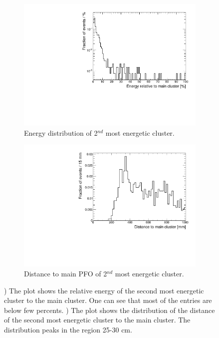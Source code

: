 \begin{figure}[htbp!]
  \centering
  \begin{subfigure}[t]{0.49\textwidth}
    \centering
    \includegraphics[width=1\linewidth]{../Thesis_Plots/ILD/AdditionalPlots/Plots/Energy2ndCluster_100ns_50GeV}
    \caption{Energy distribution of 2$^{nd}$ most energetic cluster.} \label{fig:Energy2ndCluster}
  \end{subfigure}
  \hfill
  \begin{subfigure}[t]{0.49\textwidth}
    \centering
    \includegraphics[width=1\linewidth]{../Thesis_Plots/ILD/AdditionalPlots/Plots/Distance2ndCluster_100ns_50GeV}
    \caption{Distance to main PFO of 2$^{nd}$ most energetic cluster.} \label{fig:Distance2ndCluster}
  \end{subfigure}
  \caption{) The plot shows the relative energy of the second most energetic cluster to the main cluster. One can see that most of the entries are below few percents. ) The plot shows the distribution of the distance of the second most energetic cluster to the main cluster. The distribution peaks in the region 25-30 cm.}
\end{figure}

